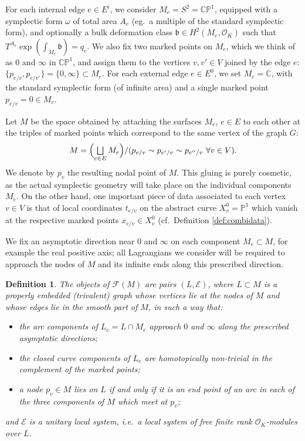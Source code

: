 \documentclass[11pt,leqno]{amsart}
\newtheorem{defi}[theo]{Definition}
\numberwithin{equation}{section}
\def\CP{\mathbb{CP}}
\def\C{\mathbb{C}}
\def\F{{\mathcal F}}
\def\PP{{\mathbb P}}
\newcommand{\cO}{{\mathcal O}}
\newcommand{\cE}{{\mathcal E}}
\begin{document}
For each internal edge $e\in E^i$,
we consider $M_e=S^2=\CP^1$, equipped with a symplectic form $\omega$ of
total area $A_e$ (eg.\ a multiple of the standard symplectic form), and optionally a bulk deformation class $\mathfrak{b}\in H^2(M_e,\cO_K)$ such
that $T^{A_e} \exp(\int_{M_e} \mathfrak{b})=q_e$. We also fix two marked points on
$M_e$, which we think of as $0$ and $\infty$ in $\CP^1$,
and assign them to the vertices $v,v'\in V$ joined by the edge $e$: 
$\{p_{e/v},p_{e/v'}\}=\{0,\infty\}\subset M_e$.  
For each external edge $e\in E^0$, we set $M_e=\C$, with the standard
symplectic form (of infinite area) and a single marked point $p_{e/v}=0\in M_e$.

Let $M$ be the space obtained by attaching the surfaces $M_e$, $e\in E$ to
each other at the triples of marked points which correspond to the same vertex 
of the graph $G$:
$$M=\textstyle \Bigl(\bigsqcup\limits_{e\in E} M_e\Bigr)/(p_{e/v}\sim p_{e'/v}\sim p_{e''/v}\ \forall v\in V).$$
We denote by $p_v$ the resulting nodal point of $M$. This gluing is purely cosmetic, as the
actual symplectic geometry will take place on the individual components
$M_e$. On the other hand, one important piece of data associated to each
vertex $v\in V$ is that of local
coordinates $t_{e/v}$ on the abstract curve $X^0_v = \PP^1$ which vanish
at the respective marked points $x_{e/v}\in X^0_v$ (cf.\ Definition
\ref{def:combidata}).

We fix an asymptotic direction near $0$ and $\infty$ on each component 
$M_e\subset M$, for example the real positive axis; all
Lagrangians we consider will be required to approach the nodes of $M$ and
its infinite ends along this prescribed direction. 

\begin{defi} The {\em objects} of $\F(M)$ are pairs $(L,\cE)$, where
$L\subset M$ is a properly embedded (trivalent) graph whose vertices lie at the
nodes of $M$ and whose edges lie in the smooth part of $M$, in such a way
that:
\begin{itemize} \item the arc components of $L_e=L\cap M_e$ approach $0$
and $\infty$ along the prescribed asymptotic directions; 
\item the closed curve components of $L_e$ are homotopically non-trivial
in the complement of the marked points;
\item a node $p_v\in M$ lies on $L$ if and only if it is an end point of an arc in
each of the three components of $M$ which meet at $p_v$;
\end{itemize}
and $\cE$ is a unitary local system, i.e.\ a local system of free
finite rank $\cO_K$-modules over $L$.
\end{defi}
\end{document}
